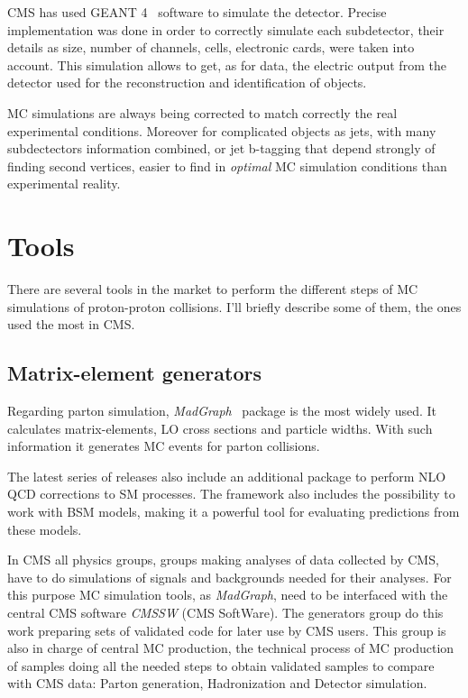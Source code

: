 CMS has used GEANT 4~\cite{Agostinelli:2002hh} software to simulate the detector. Precise implementation was done in order to correctly simulate each subdetector, their details as size, number of channels, cells, electronic cards, were taken into account. This simulation allows to get, as for data, the electric output from the detector used for the reconstruction and identification of objects. 

MC simulations are always being corrected to match correctly the real experimental conditions. Moreover for complicated objects as jets, with many subdectectors information combined, or jet b-tagging that depend strongly of finding second vertices, easier to find in \textit{optimal} MC simulation conditions than experimental reality.

\section{Tools}
\label{sec:tools}

There are several tools in the market to perform the different steps of MC simulations of proton-proton collisions. I'll briefly describe some of them, the ones used the most in CMS.

\subsection{Matrix-element generators}
\label{sec:ME}

Regarding parton simulation, \textit{MadGraph}~\cite{Alwall:2014hca, Alwall:2011uj} package is the most widely used. It calculates matrix-elements, LO cross sections and particle widths. With such information it generates MC events for parton collisions. 

The latest series of releases also include an additional package to perform NLO QCD corrections to SM processes. The framework also includes the possibility to work with BSM models, making it a powerful tool for evaluating predictions from these models. 

In CMS all physics groups, groups making analyses of data collected by CMS, have to do simulations of signals and backgrounds needed for their analyses. For this purpose MC simulation tools, as \textit{MadGraph}, need to be interfaced with the central CMS software \textit{CMSSW} (CMS SoftWare). The generators group do this work preparing sets of validated code for later use by CMS users. This group is also in charge of central MC production, the technical process of MC production of samples doing all the needed steps to obtain validated samples to compare with CMS data: Parton generation, Hadronization and Detector simulation. 

